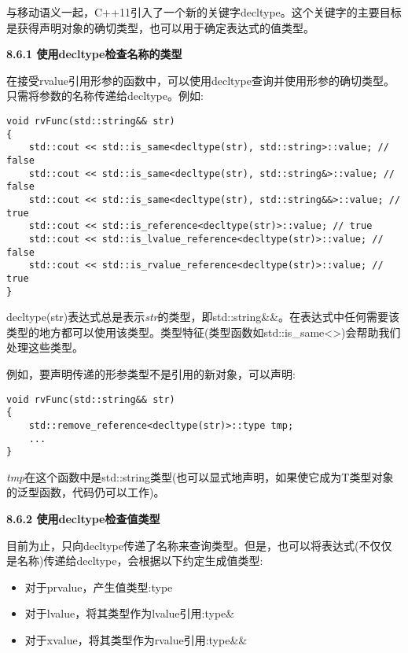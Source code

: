 与移动语义一起，C++11引入了一个新的关键字decltype。这个关键字的主要目标是获得声明对象的确切类型，也可以用于确定表达式的值类型。\par

\hspace*{\fill} \par %
\textbf{8.6.1 使用decltype检查名称的类型}

在接受rvalue引用形参的函数中，可以使用decltype查询并使用形参的确切类型。只需将参数的名称传递给decltype。例如:\par

\begin{lstlisting}[caption={}]
void rvFunc(std::string&& str)
{
	std::cout << std::is_same<decltype(str), std::string>::value; // false
	std::cout << std::is_same<decltype(str), std::string&>::value; // false
	std::cout << std::is_same<decltype(str), std::string&&>::value; // true
	std::cout << std::is_reference<decltype(str)>::value; // true
	std::cout << std::is_lvalue_reference<decltype(str)>::value; // false
	std::cout << std::is_rvalue_reference<decltype(str)>::value; // true
}
\end{lstlisting}

decltype(str)表达式总是表示\textit{str}的类型，即std::string\&\&。在表达式中任何需要该类型的地方都可以使用该类型。类型特征(类型函数如std::is\_same<>)会帮助我们处理这些类型。\par

例如，要声明传递的形参类型不是引用的新对象，可以声明:\par

\begin{lstlisting}[caption={}]
void rvFunc(std::string&& str)
{
	std::remove_reference<decltype(str)>::type tmp;
	...
}
\end{lstlisting}

\textit{tmp}在这个函数中是std::string类型(也可以显式地声明，如果使它成为T类型对象的泛型函数，代码仍可以工作)。\par

\hspace*{\fill} \par %
\textbf{8.6.2 使用decltype检查值类型}

目前为止，只向decltype传递了名称来查询类型。但是，也可以将表达式(不仅仅是名称)传递给decltype，会根据以下约定生成值类型:\par

\begin{itemize}
	\item 对于prvalue，产生值类型:type
	\item 对于lvalue，将其类型作为lvalue引用:type\&
	\item 对于xvalue，将其类型作为rvalue引用:type\&\&
\end{itemize}

